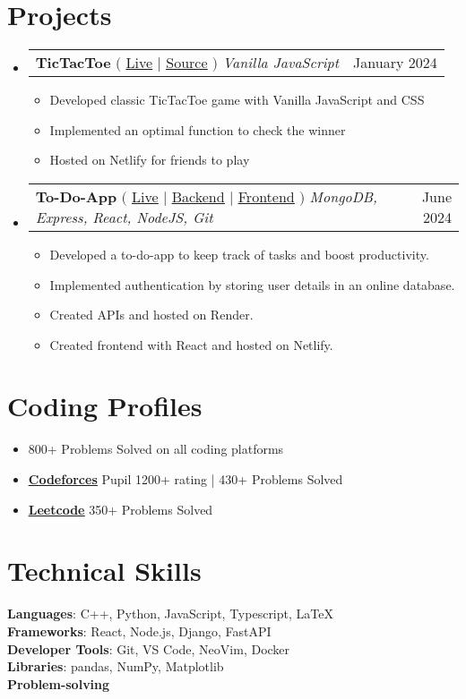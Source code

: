 \documentclass[letterpaper,11pt]{article}
\makeatletter
\newcommand{\resumeItem}[1]{
  \item\small{
    {#1 \vspace{-2pt}}
  }
}
\newcommand{\resumeProjectHeading}[2]{
    \item
    \begin{tabular*}{0.97\textwidth}{l@{\extracolsep{\fill}}r}
      \small#1 & #2 \\
    \end{tabular*}\vspace{-7pt}
}
\newcommand{\resumeSubHeadingListStart}{\begin{itemize}[leftmargin=0.15in, label={}]}
\newcommand{\resumeSubHeadingListEnd}{\end{itemize}}
\newcommand{\resumeItemListStart}{\begin{itemize}}
\newcommand{\resumeItemListEnd}{\end{itemize}\vspace{-5pt}}
\makeatother
\begin{document}
\section{Projects}
    \resumeSubHeadingListStart
      \resumeProjectHeading
          {\textbf{TicTacToe} $($
          {\href{https://tttsmooth.netlify.app/}{\underline{Live}}} $|$ 
          {\href{https://github.com/RunAtTekky/TicTacToe}{\underline{Source}}} $)$ \emph{Vanilla JavaScript}}{January 2024}
          \resumeItemListStart
            \resumeItem{Developed classic TicTacToe game with Vanilla JavaScript and CSS}
            \resumeItem{Implemented an optimal function to check the winner}
            \resumeItem{Hosted on Netlify for friends to play}
          \resumeItemListEnd
      \resumeProjectHeading
          {\textbf{To-Do-App} $($
          {\href{https://kaamkarbhai.netlify.app/}{\underline{Live}}} $|$ 
          {\href{https://github.com/RunAtTekky/to-do-app}{\underline{Backend}}} $|$
          {\href{https://github.com/RunAtTekky/react-to-do-app}{\underline{Frontend}}} $)$ \emph{ MongoDB, Express,  React, NodeJS, Git}}{June 2024}
          \resumeItemListStart
            \resumeItem{Developed a to-do-app to keep track of tasks and boost productivity.}
            \resumeItem{Implemented authentication by storing user details in an online database.}
            \resumeItem{Created APIs and hosted on Render.}
            \resumeItem{Created frontend with React and hosted on Netlify.}
          \resumeItemListEnd
    \resumeSubHeadingListEnd

\section{Coding Profiles}
    \resumeItemListStart
        \resumeItem{800+ Problems Solved on all coding platforms}
        \resumeItem{{\textbf{\href{https://codeforces.com/profile/RunAt}{\underline{Codeforces}}}} Pupil 1200+ rating | 430+ Problems Solved}
    
        \resumeItem{{\textbf{\href{https://leetcode.com/RunAtMe/}{\underline{Leetcode}}}} 350+ Problems Solved}
    \resumeItemListEnd

%
\section{Technical Skills}
 \begin{itemize}[leftmargin=0.15in, label={}]
    \small{\item{
     \textbf{Languages}{: C++, Python, JavaScript, Typescript, \LaTeX} \\
     \textbf{Frameworks}{: React, Node.js, Django, FastAPI} \\
     \textbf{Developer Tools}{: Git, VS Code, NeoVim, Docker} \\
     \textbf{Libraries}{: pandas, NumPy, Matplotlib} \\
     \textbf{Problem-solving}
    }}
 \end{itemize}


\end{document}
